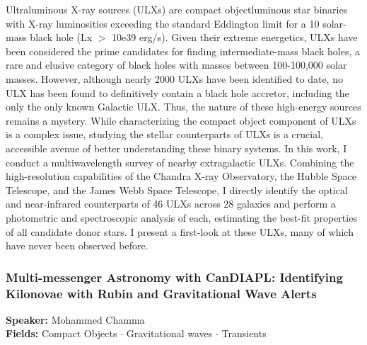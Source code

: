 Ultraluminous X-ray sources (ULXs) are compact objectluminous star binaries with X-ray luminosities exceeding the standard Eddington limit for a 10 solar-mass black hole (Lx $>$ 10e39 erg/s). Given their extreme energetics, ULXs have been considered the prime candidates for finding intermediate-mass black holes, a rare and elusive category of black holes with masses between 100-100,000 solar masses. However, although nearly 2000 ULXs have been identified to date, no ULX has been found to definitively contain a black hole accretor, including the only the only known Galactic ULX. Thus, the nature of these high-energy sources remains a mystery. While characterizing the compact object component of ULXs is a complex issue, studying the stellar counterparts of ULXs is a crucial, accessible avenue of better understanding these binary systems. In this work, I conduct a multiwavelength survey of nearby extragalactic ULXs. Combining the high-resolution capabilities of the Chandra X-ray Observatory, the Hubble Space Telescope, and the James Webb Space Telescope, I directly identify the optical and near-infrared counterparts of 46 ULXs across 28 galaxies and perform a photometric and spectroscopic analysis of each, estimating the best-fit properties of all candidate donor stars. I present a first-look at these ULXs, many of which have never been observed before.

\hypertarget{abstract-talk-140}{}\label{abstract-page-talk-140}
\subsubsection*{Multi-messenger Astronomy with CanDIAPL: Identifying Kilonovae with Rubin and Gravitational Wave Alerts}
\textbf{Speaker:} Mohammed Chamma\\
\textbf{Fields:} Compact Objects $\cdot$ Gravitational waves $\cdot$ Transients

